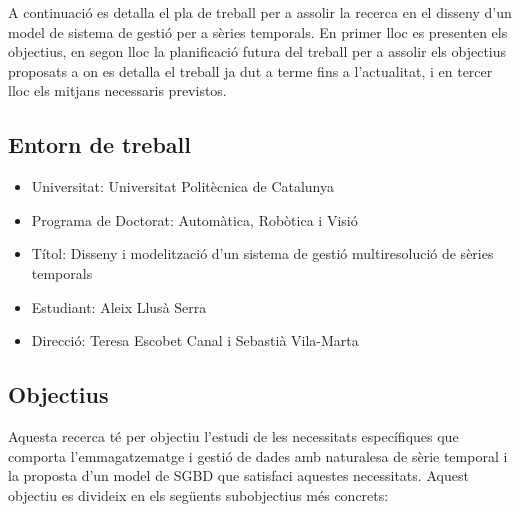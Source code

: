   A continuació es detalla el pla de treball per a assolir la
  recerca en el disseny d'un model de sistema de gestió per a sèries
  temporals. En primer lloc es presenten els objectius, en segon lloc
  la planificació futura del treball per a assolir els objectius
  proposats a on es detalla el treball ja dut a terme fins a
  l'actualitat, i en tercer lloc els mitjans necessaris previstos.




\subsection*{Entorn de treball}

\begin{itemize}
\item Universitat: Universitat Politècnica de Catalunya
\item Programa de Doctorat: Automàtica, Robòtica i Visió
\item Títol: Disseny i modelització d'un sistema de gestió
  multiresolució de sèries temporals
\item Estudiant: Aleix Llusà Serra
\item Direcció: Teresa Escobet Canal i Sebastià Vila-Marta
\end{itemize}


\subsection*{Objectius}
\label{sec:objectius}

Aquesta recerca té per objectiu l'estudi de les necessitats
específiques que comporta l'emmagatzematge i gestió de dades amb
naturalesa de sèrie temporal i la proposta d'un model de SGBD que
satisfaci aquestes necessitats. Aquest objectiu es divideix en els
següents subobjectius més concrets:

